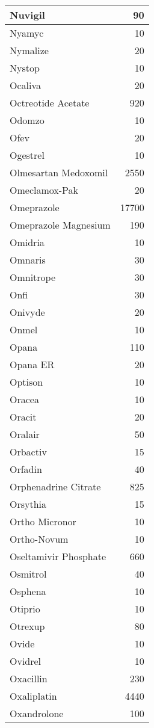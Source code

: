 \documentclass[
]{article}
\begin{document}
\begin{table}
\begin{tabular}[t]{l|r}
\hline
Nuvigil & 90\\
\hline
Nyamyc & 10\\
\hline
Nymalize & 20\\
\hline
Nystop & 10\\
\hline
Ocaliva & 20\\
\hline
Octreotide Acetate & 920\\
\hline
Odomzo & 10\\
\hline
Ofev & 20\\
\hline
Ogestrel & 10\\
\hline
Olmesartan Medoxomil & 2550\\
\hline
Omeclamox-Pak & 20\\
\hline
Omeprazole & 17700\\
\hline
Omeprazole Magnesium & 190\\
\hline
Omidria & 10\\
\hline
Omnaris & 30\\
\hline
Omnitrope & 30\\
\hline
Onfi & 30\\
\hline
Onivyde & 20\\
\hline
Onmel & 10\\
\hline
Opana & 110\\
\hline
Opana ER & 20\\
\hline
Optison & 10\\
\hline
Oracea & 10\\
\hline
Oracit & 20\\
\hline
Oralair & 50\\
\hline
Orbactiv & 15\\
\hline
Orfadin & 40\\
\hline
Orphenadrine Citrate & 825\\
\hline
Orsythia & 15\\
\hline
Ortho Micronor & 10\\
\hline
Ortho-Novum & 10\\
\hline
Oseltamivir Phosphate & 660\\
\hline
Osmitrol & 40\\
\hline
Osphena & 10\\
\hline
Otiprio & 10\\
\hline
Otrexup & 80\\
\hline
Ovide & 10\\
\hline
Ovidrel & 10\\
\hline
Oxacillin & 230\\
\hline
Oxaliplatin & 4440\\
\hline
Oxandrolone & 100\\

\end{tabular}
\end{table}
\end{document}
